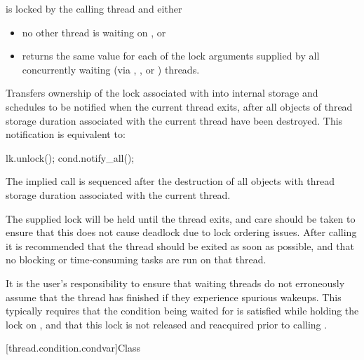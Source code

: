 \begin{itemdescr}
\pnum
\expects
{} is locked by the calling thread and either
\begin{itemize}
\item no other thread is waiting on , or
\item {} returns the same value for each of the lock arguments
supplied by all concurrently waiting (via , ,
or ) threads.
\end{itemize}

\pnum
\effects
Transfers ownership of the lock associated with  into
internal storage and schedules  to be notified when the current
thread exits, after all objects of thread storage duration associated with
the current thread have been destroyed. This notification is equivalent to:
\begin{codeblock}
lk.unlock();
cond.notify_all();
\end{codeblock}

\pnum
\sync
The implied  call is sequenced after the destruction of
all objects with thread storage duration associated with the current thread.

\pnum
\begin{note}
The supplied lock will be held until the thread exits, and care
should be taken to ensure that this does not cause deadlock due to lock
ordering issues. After calling  it is
recommended that the thread should be exited as soon as possible, and
that no blocking or time-consuming tasks are run on that thread.
\end{note}

\pnum
\begin{note}
It is the user's responsibility to ensure that waiting threads
do not erroneously assume that the thread has finished if they experience
spurious wakeups. This typically requires that the condition being waited
for is satisfied while holding the lock on , and that this lock
is not released and reacquired prior to calling .
\end{note}
\end{itemdescr}

[thread.condition.condvar]{Class }

